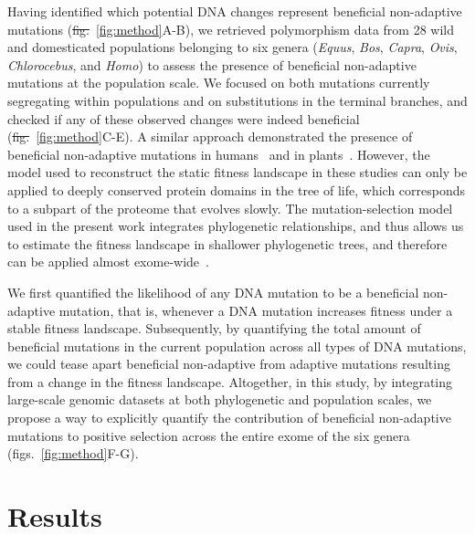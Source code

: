 \documentclass[10pt,letterpaper]{article}
\providecommand{\DIFaddtex}[1]{{\protect\color{blue}\uwave{#1}}} %
\providecommand{\DIFdeltex}[1]{{\protect\color{red}\sout{#1}}}                      %
\providecommand{\DIFaddbegin}{} %
\providecommand{\DIFaddend}{} %
\providecommand{\DIFdelbegin}{} %
\providecommand{\DIFdelend}{} %
\providecommand{\DIFadd}[1]{\texorpdfstring{\DIFaddtex{#1}}{#1}} %
\providecommand{\DIFdel}[1]{\texorpdfstring{\DIFdeltex{#1}}{}} %
\newcommand{\DIFscaledelfig}{0.5}
\newlength{\DIFdelgraphicswidth} %
\newlength{\DIFdelgraphicsheight} %
\newcommand{\DIFaddincludegraphics}[2][]{{\color{blue}\fbox{\DIFOincludegraphics[#1]{#2}}}} %
\newcommand{\DIFdelincludegraphics}[2][]{%
\sbox{\DIFdelgraphicsbox}{\DIFOincludegraphics[#1]{#2}}%
\settoboxwidth{\DIFdelgraphicswidth}{\DIFdelgraphicsbox} %
\settoboxtotalheight{\DIFdelgraphicsheight}{\DIFdelgraphicsbox} %
\scalebox{\DIFscaledelfig}{%
\parbox[b]{\DIFdelgraphicswidth}{\usebox{\DIFdelgraphicsbox}\\[-\baselineskip] \rule{\DIFdelgraphicswidth}{0em}}\llap{\resizebox{\DIFdelgraphicswidth}{\DIFdelgraphicsheight}{%
\setlength{\unitlength}{\DIFdelgraphicswidth}%
\begin{picture}(1,1)%
\thicklines\linethickness{2pt} %
{\color[rgb]{1,0,0}\put(0,0){\framebox(1,1){}}}%
{\color[rgb]{1,0,0}\put(0,0){\line( 1,1){1}}}%
{\color[rgb]{1,0,0}\put(0,1){\line(1,-1){1}}}%
\end{picture}%
}\hspace*{3pt}}} %
} %
\DeclareRobustCommand{\DIFaddbegin}{\DIFOaddbegin \let\includegraphics\DIFaddincludegraphics} %
\DeclareRobustCommand{\DIFaddend}{\DIFOaddend \let\includegraphics\DIFOincludegraphics} %
\DeclareRobustCommand{\DIFdelbegin}{\DIFOdelbegin \let\includegraphics\DIFdelincludegraphics} %
\DeclareRobustCommand{\DIFdelend}{\DIFOaddend \let\includegraphics\DIFOincludegraphics} %
\begin{document}
Having identified which potential DNA changes represent beneficial non-adaptive mutations (\DIFdelbegin \DIFdel{fig.}\DIFdelend \DIFaddbegin \DIFadd{Fig}\DIFaddend ~\ref{fig:method}A-B), we retrieved polymorphism data from 28 wild and domesticated populations belonging to six genera (\textit{Equus}, \textit{Bos}, \textit{Capra}, \textit{Ovis}, \textit{Chlorocebus}, and \textit{Homo}) to assess the presence of beneficial non-adaptive mutations at the population scale.
We focused on both mutations currently segregating within populations and on substitutions in the terminal branches, and checked if any of these observed changes were indeed beneficial (\DIFdelbegin \DIFdel{fig.}\DIFdelend \DIFaddbegin \DIFadd{Fig}\DIFaddend ~\ref{fig:method}C-E).
A similar approach demonstrated the presence of beneficial non-adaptive mutations in humans~\cite{moses_inferring_2009, fischer_germline_2011} and in plants~\cite{chen_hunting_2021}.
However, the model used to reconstruct the static fitness landscape in these studies can only be applied to deeply conserved protein domains in the tree of life, which corresponds to a subpart of the proteome that evolves slowly.
The mutation-selection model used in the present work integrates phylogenetic relationships, and thus allows us to estimate the fitness landscape in shallower phylogenetic trees, and therefore can be applied almost exome-wide~\cite{rodrigue_mutationselection_2010}.

We first quantified the likelihood of any DNA mutation to be a beneficial non-adaptive mutation, that is, whenever a DNA mutation increases fitness under a stable fitness landscape.
Subsequently, by quantifying the total amount of beneficial mutations in the current population across all types of DNA mutations, we could tease apart beneficial non-adaptive from adaptive mutations resulting from a change in the fitness landscape.
Altogether, in this study, by integrating large-scale genomic datasets at both phylogenetic and population scales, we propose a way to explicitly quantify the contribution of beneficial non-adaptive mutations to positive selection across the entire exome of the six genera (figs.~\ref{fig:method}F-G).

\section*{Results}
\end{document}
